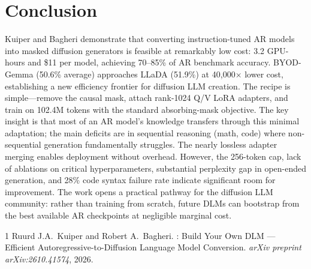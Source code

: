 \documentclass[11pt,a4paper]{article}
\begin{document}
\section{Conclusion}
Kuiper and Bagheri demonstrate that converting instruction-tuned AR models into masked diffusion generators is feasible at remarkably low cost: 3.2 GPU-hours and \$11 per model, achieving 70--85\% of AR benchmark accuracy. BYOD-Gemma (50.6\% average) approaches LLaDA (51.9\%) at 40{,}000$\times$ lower cost, establishing a new efficiency frontier for diffusion LLM creation. The recipe is simple---remove the causal mask, attach rank-1024 Q/V LoRA adapters, and train on 102.4M tokens with the standard absorbing-mask objective. The key insight is that most of an AR model's knowledge transfers through this minimal adaptation; the main deficits are in sequential reasoning (math, code) where non-sequential generation fundamentally struggles. The nearly lossless adapter merging enables deployment without overhead. However, the 256-token cap, lack of ablations on critical hyperparameters, substantial perplexity gap in open-ended generation, and 28\% code syntax failure rate indicate significant room for improvement. The work opens a practical pathway for the diffusion LLM community: rather than training from scratch, future DLMs can bootstrap from the best available AR checkpoints at negligible marginal cost.


\begin{thebibliography}{1}
Ruurd J.A.\ Kuiper and Robert A.\ Bagheri.
: Build Your Own {DLM} --- Efficient Autoregressive-to-Diffusion Language Model Conversion.
\newblock \emph{arXiv preprint arXiv:2610.41574}, 2026.
\end{thebibliography}
\end{document}
